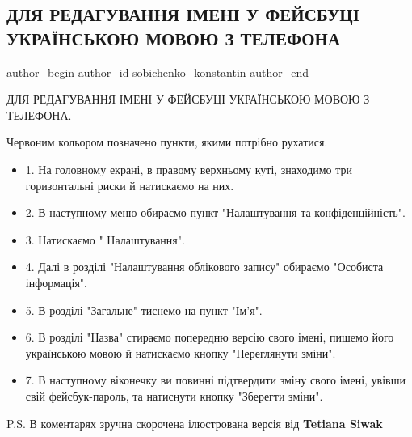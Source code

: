  
 
 
 
 
 
\subsection{ДЛЯ РЕДАГУВАННЯ ІМЕНІ У ФЕЙСБУЦІ УКРАЇНСЬКОЮ МОВОЮ З ТЕЛЕФОНА}
\label{sec:16_05_2021.fb.sobichenko_konstantin.1.facebook_mova_telefon}
 
\ifcmt
 author_begin
   author_id sobichenko_konstantin
 author_end
\fi

ДЛЯ РЕДАГУВАННЯ ІМЕНІ У ФЕЙСБУЦІ УКРАЇНСЬКОЮ МОВОЮ З ТЕЛЕФОНА.

Червоним кольором позначено пункти, якими потрібно рухатися. 

\begin{itemize}
  \item 1. На головному екрані, в правому верхньому куті, знаходимо три горизонтальні риски й натискаємо на них.
  \item 2. В наступному меню обираємо пункт "Налаштування та конфіденційність".
  \item 3. Натискаємо " Налаштування".
  \item 4. Далі в розділі "Налаштування облікового запису" обираємо "Особиста інформація". 
  \item 5. В розділі "Загальне" тиснемо на пункт "Ім'я".
  \item 6. В розділі "Назва" стираємо попередню версію свого імені, пишемо його українською мовою й натискаємо кнопку "Переглянути зміни". 
  \item 7. В наступному віконечку ви повинні підтвердити зміну свого імені, увівши свій фейсбук-пароль, та натиснути кнопку "Зберегти зміни". 
\end{itemize}

P.S. В коментарях зручна скорочена ілюстрована версія від \textbf{Tetiana Siwak}

